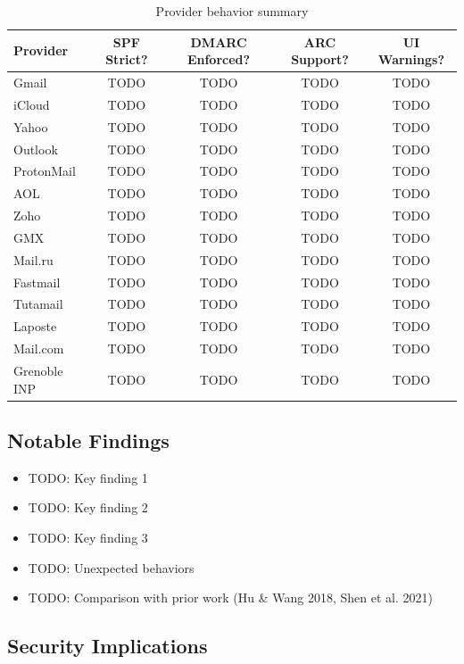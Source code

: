 \documentclass[11pt,a4paper]{article}
\begin{document}
\begin{table}[h]
\centering
\small
\begin{tabular}{lcccc}
\toprule
\textbf{Provider} & \textbf{SPF Strict?} & \textbf{DMARC Enforced?} & \textbf{ARC Support?} & \textbf{UI Warnings?} \\
\midrule
Gmail & TODO & TODO & TODO & TODO \\
iCloud & TODO & TODO & TODO & TODO \\
Yahoo & TODO & TODO & TODO & TODO \\
Outlook & TODO & TODO & TODO & TODO \\
ProtonMail & TODO & TODO & TODO & TODO \\
AOL & TODO & TODO & TODO & TODO \\
Zoho & TODO & TODO & TODO & TODO \\
GMX & TODO & TODO & TODO & TODO \\
Mail.ru & TODO & TODO & TODO & TODO \\
Fastmail & TODO & TODO & TODO & TODO \\
Tutamail & TODO & TODO & TODO & TODO \\
Laposte & TODO & TODO & TODO & TODO \\
Mail.com & TODO & TODO & TODO & TODO \\
Grenoble INP & TODO & TODO & TODO & TODO \\
\bottomrule
\end{tabular}
\caption{Provider behavior summary}
\end{table}

\subsection{Notable Findings}

\begin{itemize}[noitemsep]
    \item TODO: Key finding 1
    \item TODO: Key finding 2
    \item TODO: Key finding 3
    \item TODO: Unexpected behaviors
    \item TODO: Comparison with prior work (Hu \& Wang 2018, Shen et al. 2021)
\end{itemize}

\subsection{Security Implications}
\end{document}
